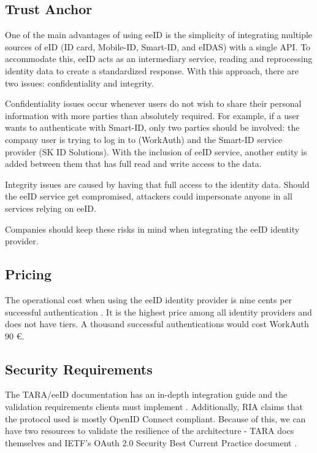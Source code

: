 \subsection{Trust Anchor}

One of the main advantages of using eeID is the simplicity of integrating multiple sources of eID (ID card, Mobile-ID, Smart-ID, and eIDAS) with a single API. To accommodate this, eeID acts as an intermediary service, reading and reprocessing identity data to create a standardized response. With this approach, there are two issues: confidentiality and integrity.

Confidentiality issues occur whenever users do not wish to share their personal information with more parties than absolutely required. For example, if a user wants to authenticate with Smart-ID, only two parties should be involved: the company user is trying to log in to (WorkAuth) and the Smart-ID service provider (SK ID Solutions). With the inclusion of eeID service, another entity is added between them that has full read and write access to the data.

Integrity issues are caused by having that full access to the identity data. Should the eeID service get compromised, attackers could impersonate anyone in all services relying on eeID.

Companies should keep these risks in mind when integrating the eeID identity provider.

\subsection{Pricing}

The operational cost when using the eeID identity provider is nine cents per successful authentication \cite{eeid-pricing}. It is the highest price among all identity providers and does not have tiers. A thousand successful authentications would cost WorkAuth 90 €.

\subsection{Security Requirements}

The TARA/eeID documentation has an in-depth integration guide and the validation requirements clients must implement \cite{tara-technical}. Additionally, RIA claims that the protocol used is mostly OpenID Connect compliant. Because of this, we can have two resources to validate the resilience of the architecture - TARA docs themselves \cite{tara-technical} and IETF's OAuth 2.0 Security Best Current Practice document \cite{ietf-oauth-security-topics-19}.

